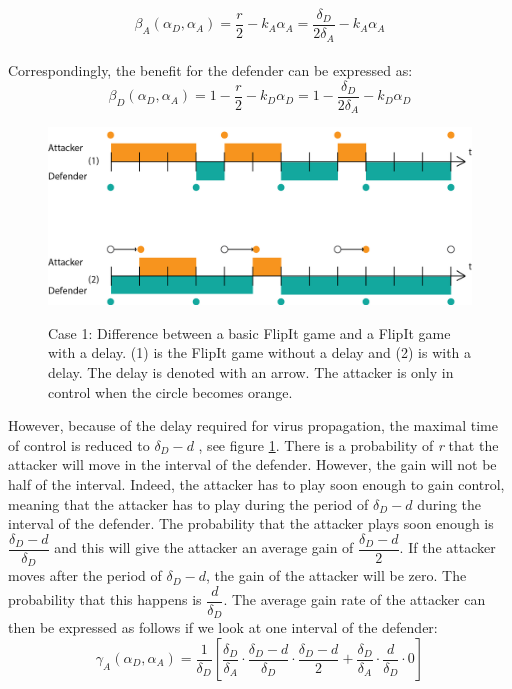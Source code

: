 \begin{equation*}
\beta_{A}(\alpha_{D},\alpha_{A}) =\dfrac {r} {2} - k_{A} \alpha_{A} = \dfrac {\delta_{D}} {2\delta_{A}} - k_{A} \alpha_{A}  
\end{equation*}\\

Correspondingly, the benefit for the defender can be expressed as:
\begin{equation*}
\beta_{D}(\alpha_{D},\alpha_{A}) =1 -  \dfrac {r} {2} - k_{D} \alpha_{D} = 1 - \dfrac {\delta_{D}} {2\delta_{A}} - k_{D} \alpha_{D} 
\end{equation*}

\begin{figure}[hbtp]
\caption{Case 1: Difference between a basic FlipIt game and a FlipIt game with a delay. (1) is the FlipIt game without a delay and (2) is with a delay. The delay is denoted with an arrow. The attacker is only in control when the circle becomes orange.}
\centering
\includegraphics[scale=0.6]{../../doc/template/Images/DiffDelayCase1.png}
\label{fig:delaycase1}
\end{figure}


However, because of the delay required for virus propagation, the maximal time of control is reduced to $\delta_{D}-d$ , see figure \ref{fig:delaycase1}. There is a probability of \textit{r} that the attacker will move in the interval of the defender. However, the gain will not be half of the interval. Indeed, the attacker has to play soon enough to gain control, meaning that the attacker has to play during the period of $\delta_{D}-d$ during the interval of the defender. The probability that the attacker plays soon enough is $\dfrac{\delta_{D}-d}{\delta_{D}}$ and this will give the attacker an average gain of $\dfrac{\delta_{D}-d}{2}$. If the attacker moves after the period of $\delta_{D}-d$, the gain of the attacker will be zero. The probability that this happens is  $\dfrac{d}{\delta_{D}}$. The average gain rate of the attacker can then be expressed as follows if we look at one interval of the defender:
\begin{equation*}
\gamma_{A}(\alpha_{D},\alpha_{A}) = \dfrac {1}{\delta_{D}} [ \dfrac{\delta_{D}}{\delta_{A}} \cdot \dfrac{\delta_{D}-d}{\delta_{D}} \cdot \dfrac{\delta_{D}-d}{2} + \dfrac{\delta_{D}}{\delta_{A}} \cdot \dfrac{d}{\delta_{D}} \cdot 0 ]
\end{equation*}

